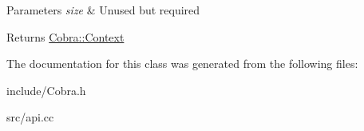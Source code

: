 \begin{DoxyParams}{Parameters}
{\em size} & Unused but required \\
\hline
\end{DoxyParams}
\begin{DoxyReturn}{Returns}
\hyperlink{class_cobra_1_1_context}{Cobra\+::\+Context} 
\end{DoxyReturn}


The documentation for this class was generated from the following files\+:\begin{DoxyCompactItemize}
\item 
include/Cobra.\+h\item 
src/api.\+cc\end{DoxyCompactItemize}
